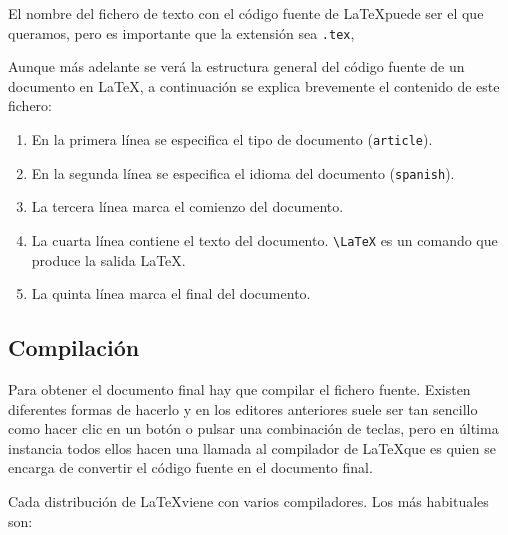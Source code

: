 \documentclass[
  a4paper,
]{scrreport}
\providecommand{\tightlist}{%
  \setlength{\itemsep}{0pt}\setlength{\parskip}{0pt}}\usepackage{longtable,booktabs,array}
\theoremstyle{definition}
\theoremstyle{remark}
\begin{document}
\begin{tcolorbox}[enhanced jigsaw, colframe=quarto-callout-important-color-frame, opacityback=0, title=\textcolor{quarto-callout-important-color}{\faExclamation}\hspace{0.5em}{Importante}, bottomrule=.15mm, left=2mm, coltitle=black, arc=.35mm, leftrule=.75mm, colback=white, rightrule=.15mm, colbacktitle=quarto-callout-important-color!10!white, toprule=.15mm, breakable, opacitybacktitle=0.6, bottomtitle=1mm, toptitle=1mm, titlerule=0mm]

El nombre del fichero de texto con el código fuente de \LaTeX puede ser
el que queramos, pero es importante que la extensión sea \texttt{.tex},

\end{tcolorbox}

Aunque más adelante se verá la estructura general del código fuente de
un documento en \LaTeX, a continuación se explica brevemente el
contenido de este fichero:

\begin{enumerate}
\def\labelenumi{\arabic{enumi}.}
\tightlist
\item
  En la primera línea se especifica el tipo de documento
  (\texttt{article}).
\item
  En la segunda línea se especifica el idioma del documento
  (\texttt{spanish}).
\item
  La tercera línea marca el comienzo del documento.
\item
  La cuarta línea contiene el texto del documento.
  \texttt{\textbackslash{}LaTeX} es un comando que produce la salida
  \LaTeX.
\item
  La quinta línea marca el final del documento.
\end{enumerate}

\subsection{Compilación}\label{compilaciuxf3n}

Para obtener el documento final hay que compilar el fichero fuente.
Existen diferentes formas de hacerlo y en los editores anteriores suele
ser tan sencillo como hacer clic en un botón o pulsar una combinación de
teclas, pero en última instancia todos ellos hacen una llamada al
compilador de \LaTeX que es quien se encarga de convertir el código
fuente en el documento final.

Cada distribución de \LaTeX viene con varios compiladores. Los más
habituales son:
\end{document}
